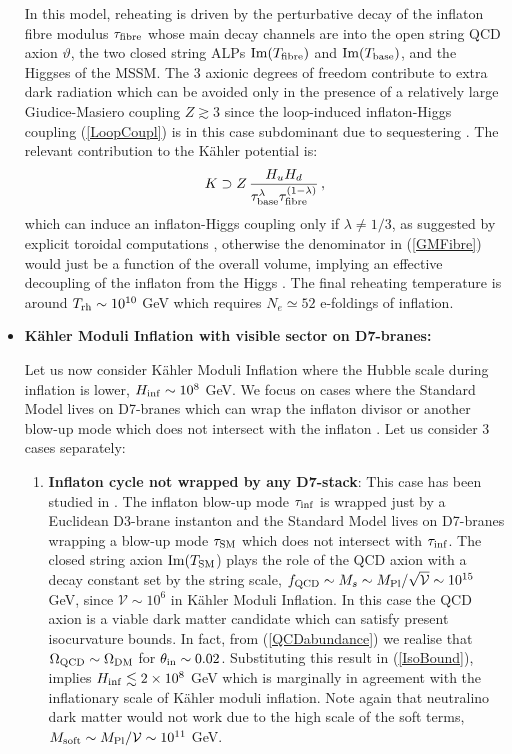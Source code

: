 \begin{itemize}
In this model, reheating is driven by the perturbative decay of the inflaton fibre modulus $\tau_{\rm fibre}$ whose main decay channels are into the open string QCD axion $\vartheta$, the two closed string ALPs ${\rm Im}(T_{\rm fibre})$ and ${\rm Im}(T_{\rm base})$, and the Higgses of the MSSM. The 3 axionic degrees of freedom contribute to extra dark radiation which can be avoided only in the presence of a relatively large Giudice-Masiero coupling $Z\gtrsim 3$ since the loop-induced inflaton-Higgs coupling (\ref{LoopCoupl}) is in this case subdominant due to sequestering \cite{Cicoli:2022uqa}. The relevant contribution to the K\"ahler potential is:
\begin{equation}
K \supset Z\,\frac{H_u H_d}{\tau_{\rm base}^\lambda \tau_{\rm fibre}^{(1-\lambda)}}\,,
\label{GMFibre}
\end{equation}
which can induce an inflaton-Higgs coupling only if $\lambda\neq 1/3$, as suggested by explicit toroidal computations \cite{Aparicio:2008wh}, otherwise the denominator in (\ref{GMFibre}) would just be a function of the overall volume, implying an effective decoupling of the inflaton from the Higgs \cite{Angus:2014bia}. The final reheating temperature is around $T_{\rm rh}\sim 10^{10}$ GeV which requires $N_e\simeq 52$ e-foldings of inflation. 

\item \textbf{K\"ahler Moduli Inflation with visible sector on D7-branes:}

Let us now consider K\"ahler Moduli Inflation where the Hubble scale during inflation is lower, $H_{\rm inf}\sim 10^8$ GeV. We focus on cases where the Standard Model lives on D7-branes which can wrap the inflaton divisor or another blow-up mode which does not intersect with the inflaton \cite{Cicoli:2010ha}. Let us consider 3 cases separately:

\begin{enumerate}
\item \textbf{Inflaton cycle not wrapped by any D7-stack}: This case has been studied in \cite{Cicoli:2022fzy}. The inflaton blow-up mode $\tau_{\rm inf}$ is wrapped just by a Euclidean D3-brane instanton and the Standard Model lives on D7-branes wrapping a blow-up mode $\tau_{\rm SM}$ which does not intersect with $\tau_{\rm inf}$. The closed string axion ${\rm Im}(T_{\rm SM}$) plays the role of the QCD axion with a decay constant set by the string scale, $f_{\rm QCD}\sim M_s\sim M_{\rm Pl}/\sqrt{\mathcal{V}}\sim 10^{15}$ GeV, since $\mathcal{V}\sim 10^6$ in K\"ahler Moduli Inflation. In this case the QCD axion is a viable dark matter candidate which can satisfy present isocurvature bounds. In fact, from (\ref{QCDabundance}) we realise that $\Omega_{\rm QCD}\sim \Omega_{\rm DM}$ for $\theta_{\rm in}\sim 0.02$. Substituting this result in (\ref{IsoBound}), implies $H_{\rm inf}\lesssim 2\times 10^8$ GeV which is marginally in agreement with the inflationary scale of K\"ahler moduli inflation. Note again that neutralino dark matter would not work due to the high scale of the soft terms, $M_{\rm soft}\sim M_{\rm Pl}/\mathcal{V}\sim 10^{11}$ GeV. 


\end{enumerate}
\end{itemize}
